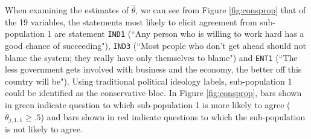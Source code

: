 \documentclass{article}\usepackage[]{graphicx}\usepackage[]{color}
\begin{document}
When examining the estimates of $\hat \theta$, we can see from Figure \ref{fig:consprop} that of the 19 variables, the statements most likely to elicit agreement from sub-population 1 are statement \texttt{IND1} (``Any person who is willing to work hard has a good chance of succeeding"), \texttt{IND3} (``Most people who don't get ahead should not blame the system; they really have only themselves to blame") and \texttt{ENT1} (``The less government gets involved with business and the economy, the better off this country will be"). Using traditional political ideology labels, sub-population 1 could be identified as the conservative bloc. In Figure \ref{fig:consprop}, bars shown in green indicate question to which sub-population 1 is more likely to agree ($\theta_{j,1,1} \geq .5$) and bars shown in red indicate questions to which the sub-population is not likely to agree.
\end{document}
